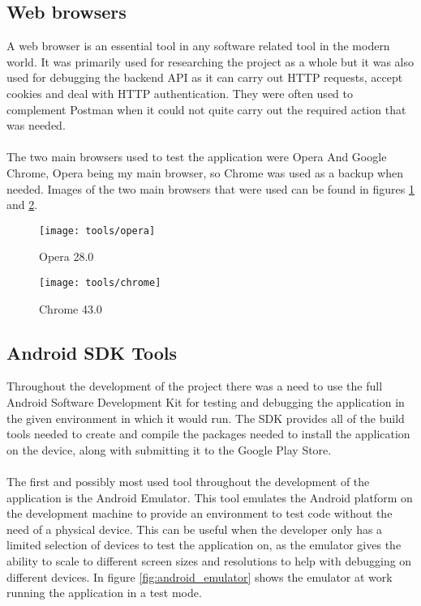 \subsection{Web browsers}

A web browser is an essential tool in any software related tool in the modern world. It was primarily used for researching the project as a whole but it was also used for debugging the backend API as it can carry out HTTP requests, accept cookies and deal with HTTP authentication. They were often used to complement Postman when it could not quite carry out the required action that was needed.\\
\\
The two main browsers used to test the application were Opera And Google Chrome, Opera being my main browser, so Chrome was used as a backup when needed. Images of the two main browsers that were used can be found in figures \ref{fig:opera_image} and \ref{fig:chrome_image}.

\begin{figure}[H]
    \centering
    \texttt{[image: tools/opera]}
    \caption{Opera 28.0}
    \label{fig:opera_image}
\end{figure} 

\begin{figure}[H]
    \centering
    \texttt{[image: tools/chrome]}
    \caption{Chrome 43.0}
    \label{fig:chrome_image}
\end{figure} 

\subsection{Android SDK Tools}

Throughout the development of the project there was a need to use the full Android Software Development Kit for testing and debugging the application in the given environment in which it would run. The SDK provides all of the build tools needed to create and compile the packages needed to install the application on the device, along with submitting it to the Google Play Store.\\
\\
The first and possibly most used tool throughout the development of the application is the Android Emulator. This tool emulates the Android platform on the development machine to provide an environment to test code without the need of a physical device. This can be useful when the developer only has a limited selection of devices to test the application on, as the emulator gives the ability to scale to different screen sizes and resolutions to help with debugging on different devices. In figure \ref{fig:android_emulator} shows the emulator at work running the application in a test mode.


